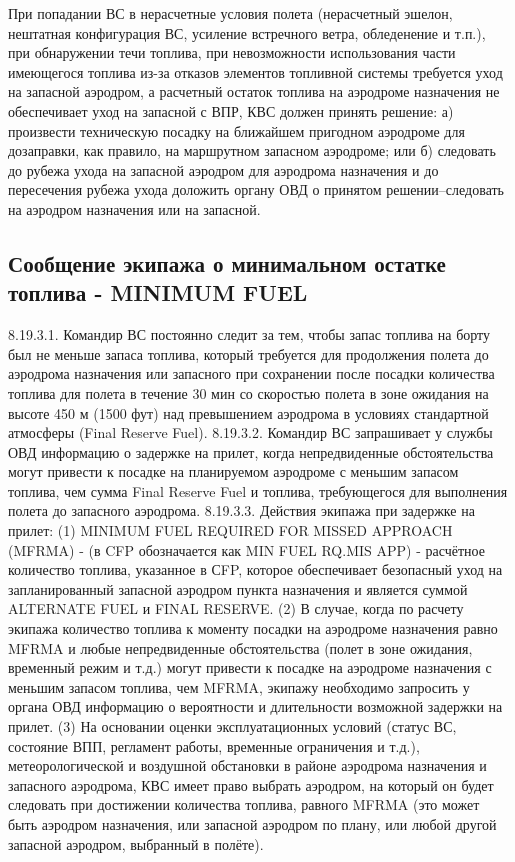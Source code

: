 При попадании ВС в нерасчетные условия полета (нерасчетный эшелон, нештатная конфигурация ВС, усиление встречного ветра, обледенение и т.п.), при обнаружении течи топлива, при невозможности использования части имеющегося топлива из-за отказов элементов топливной системы требуется уход на запасной аэродром, а расчетный остаток топлива на аэродроме назначения не обеспечивает уход на запасной с ВПР, КВС должен принять решение:
а)	произвести техническую посадку на ближайшем пригодном аэродроме для дозаправки, как правило, на маршрутном запасном аэродроме; или
б)	следовать до рубежа ухода на запасной аэродром для аэродрома назначения и до пересечения рубежа ухода доложить органу ОВД о принятом решении–следовать на аэродром назначения или на запасной.

\subsection{Сообщение экипажа о минимальном остатке топлива - MINIMUM FUEL}
8.19.3.1. Командир ВС постоянно следит за тем, чтобы запас топлива на борту был не меньше запаса топлива, который требуется для продолжения полета до аэродрома назначения или запасного при сохранении после посадки количества топлива для полета в течение 30 мин со скоростью полета в зоне ожидания на высоте 450 м (1500 фут) над превышением аэродрома в условиях стандартной атмосферы (Final Reserve Fuel).
8.19.3.2. Командир ВС запрашивает у службы ОВД информацию о задержке на прилет, когда непредвиденные обстоятельства могут привести к посадке на планируемом аэродроме с меньшим запасом топлива, чем сумма Final Reserve Fuel и топлива, требующегося для выполнения полета до запасного аэродрома.
8.19.3.3. Действия экипажа при задержке на прилет:
(1) MINIMUM FUEL REQUIRED FOR MISSED APPROACH (MFRMA) - (в CFP обозначается как MIN FUEL RQ.MIS APP) - расчётное количество топлива, указанное в СFP, которое обеспечивает безопасный уход на запланированный запасной аэродром пункта назначения и является суммой ALTERNATE FUEL и FINAL RESERVE. 
(2) В случае, когда по расчету экипажа количество топлива к моменту посадки на аэродроме назначения равно MFRMA и любые непредвиденные обстоятельства (полет в зоне ожидания, временный режим и т.д.) могут привести к посадке на аэродроме назначения с меньшим запасом топлива, чем MFRMA, экипажу необходимо запросить у органа ОВД информацию о вероятности и длительности возможной задержки на прилет.
(3) На основании оценки эксплуатационных условий (статус ВС, состояние ВПП, регламент работы, временные ограничения и т.д.), метеорологической и воздушной обстановки в районе аэродрома назначения и запасного аэродрома, КВС имеет право выбрать аэродром, на который он будет следовать при достижении количества топлива, равного MFRMA (это может быть аэродром назначения, или запасной аэродром по плану, или любой другой запасной аэродром, выбранный в полёте).
